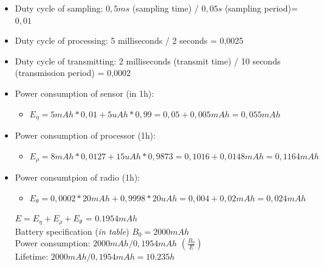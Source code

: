 \documentclass[10pt,a4paper]{report}
\theoremstyle{definition}
\begin{document}
\begin{itemize}
	\item Duty cycle of sampling: $0,5ms$ (sampling time) / $0,05s$ (sampling period)= $0,01$
	\item 
	Duty cycle of processing: 5 milliseconds / 2 seconds = 0,0025 
	\item 
	Duty cycle of transmitting: 2 milliseconds (transmit time) / 10 seconds (transmission period) = 0,0002
	\item 
	Power consumption of sensor (in 1h):
	\begin{itemize}
		\item 
		$E_{\eta} = 5 mAh * 0,01+ 5 uAh *0,99 =0,05+0,005 mAh = 0,055 mAh$
	\end{itemize}
	\item 
	Power consumption of processor (1h):
	\begin{itemize}
		\item 
		$E_{\rho} = 8 mAh * 0,0127+ 15 uAh *0,9873 =0,1016+0,0148 mAh = 0,1164 mAh$
	\end{itemize}
	\item 
	Power consumtpion of radio (1h):
	\begin{itemize}
		\item 
		$E_{\theta} = 0,0002 *20mAh + 0,9998 *20uAh = 0,004 + 0,02 mAh = 0,024 mAh$
		
	
	\end{itemize}
	
	\begin{center}
			$E = E_{\eta} + E_{\rho} + E_{\theta}$ = $0.1954 mAh$\\
		Battery specification (\textit{in table}) $B_{0} = 2000mAh$\\
		Power consumption: $2000 mAh / 0,1954 mAh$     $(\frac{B_{0}}{E})$\\
			Lifetime: $2000 mAh / 0,1954 mAh = 10.235 h$
	\end{center}

\end{itemize}
\end{document}
